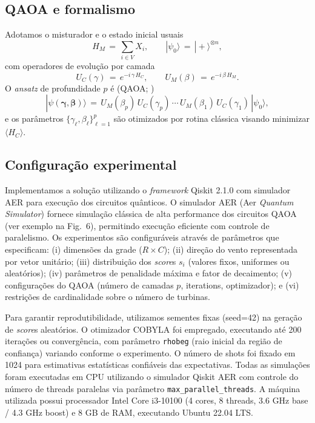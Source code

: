 \documentclass{weciq}
\begin{document}
\subsection{QAOA e formalismo}
Adotamos o misturador e o estado inicial usuais
\begin{equation}
  H_M \,=\, \sum_{i\in V} X_i,\qquad |\psi_0\rangle \,=\, |+\rangle^{\otimes n},
\end{equation}
com operadores de evolução por camada
\begin{equation}
  U_C(\gamma) \,=\, e^{-i\,\gamma\, H_C},\qquad U_M(\beta) \,=\, e^{-i\,\beta\, H_M}.
\end{equation}
O \textit{ansatz} de profundidade $p$ é (QAOA; \cite{Farhi2014,QiskitAlgorithms})
\begin{equation}
  |\psi(\boldsymbol{\gamma},\boldsymbol{\beta})\rangle \,=\, U_M(\beta_p)\,U_C(\gamma_p)\,\cdots\,U_M(\beta_1)\,U_C(\gamma_1)\,|\psi_0\rangle,
\end{equation}
e os parâmetros $\{\gamma_\ell,\beta_\ell\}_{\ell=1}^p$ são otimizados por rotina clássica visando minimizar $\langle H_C\rangle$.

\subsection{Configuração experimental}
Implementamos a solução utilizando o \textit{framework} Qiskit 2.1.0 \cite{QiskitCommunity2017} com simulador AER para execução dos circuitos quânticos. O simulador AER (Aer \textit{Quantum Simulator}) fornece simulação clássica de alta performance dos circuitos QAOA (ver exemplo na Fig.~6), permitindo execução eficiente com controle de paralelismo. Os experimentos são configuráveis através de parâmetros que especificam: (i) dimensões da grade ($R \times C$); (ii) direção do vento representada por vetor unitário; (iii) distribuição dos \textit{score}s $s_i$ (valores fixos, uniformes ou aleatórios); (iv) parâmetros de penalidade máxima e fator de decaimento; (v) configurações do QAOA (número de camadas $p$, iterations, optimizador); e (vi) restrições de cardinalidade sobre o número de turbinas.

Para garantir reprodutibilidade, utilizamos sementes fixas (seed=42) na geração de \textit{score}s aleatórios. O otimizador COBYLA foi empregado, executando até 200 iterações ou convergência, com parâmetro \texttt{rhobeg} (raio inicial da região de confiança) variando conforme o experimento. O número de shots foi fixado em 1024 para estimativas estatísticas confiáveis das expectativas. Todas as simulações foram executadas em CPU utilizando o simulador Qiskit AER com controle do número de threads paralelas via parâmetro \texttt{max\_parallel\_threads}. A máquina utilizada possui processador Intel Core i3-10100 (4 cores, 8 threads, 3.6 GHz base / 4.3 GHz boost) e 8 GB de RAM, executando Ubuntu 22.04 LTS.
\end{document}
